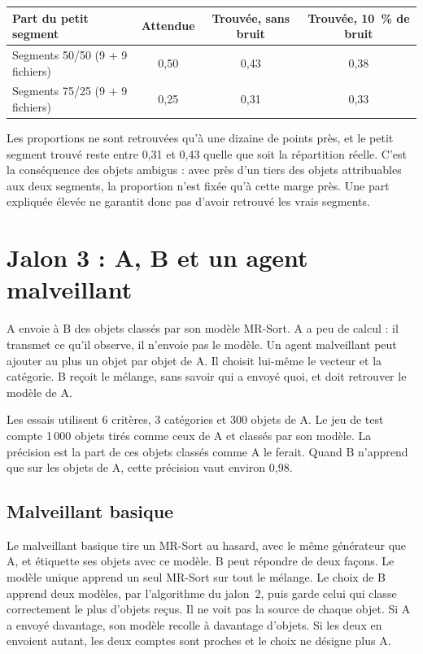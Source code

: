 \documentclass[11pt,a4paper]{article}
\begin{document}
\begin{center}
\begin{tabular}{lccc}
\toprule
Part du petit segment & Attendue & Trouvée, sans bruit & Trouvée, 10~\% de bruit \\
\midrule
Segments 50/50 (9 + 9 fichiers) & 0,50 & 0,43 & 0,38 \\
Segments 75/25 (9 + 9 fichiers) & 0,25 & 0,31 & 0,33 \\
\bottomrule
\end{tabular}
\end{center}

Les proportions ne sont retrouvées qu'à une dizaine de points près, et le petit segment trouvé reste entre 0,31 et 0,43 quelle que soit la répartition réelle. C'est la conséquence des objets ambigus : avec près d'un tiers des objets attribuables aux deux segments, la proportion n'est fixée qu'à cette marge près. Une part expliquée élevée ne garantit donc pas d'avoir retrouvé les vrais segments.

\section{Jalon 3 : A, B et un agent malveillant}

A envoie à B des objets classés par son modèle MR-Sort. A a peu de calcul : il transmet ce qu'il observe, il n'envoie pas le modèle. Un agent malveillant peut ajouter au plus un objet par objet de A. Il choisit lui-même le vecteur et la catégorie. B reçoit le mélange, sans savoir qui a envoyé quoi, et doit retrouver le modèle de A.

Les essais utilisent 6 critères, 3 catégories et 300 objets de A. Le jeu de test compte 1\,000 objets tirés comme ceux de A et classés par son modèle. La précision est la part de ces objets classés comme A le ferait. Quand B n'apprend que sur les objets de A, cette précision vaut environ 0,98.

\subsection{Malveillant basique}

Le malveillant basique tire un MR-Sort au hasard, avec le même générateur que A, et étiquette ses objets avec ce modèle. B peut répondre de deux façons. Le modèle unique apprend un seul MR-Sort sur tout le mélange. Le choix de B apprend deux modèles, par l'algorithme du jalon~2, puis garde celui qui classe correctement le plus d'objets reçus. Il ne voit pas la source de chaque objet. Si A a envoyé davantage, son modèle recolle à davantage d'objets. Si les deux en envoient autant, les deux comptes sont proches et le choix ne désigne plus A.
\end{document}
